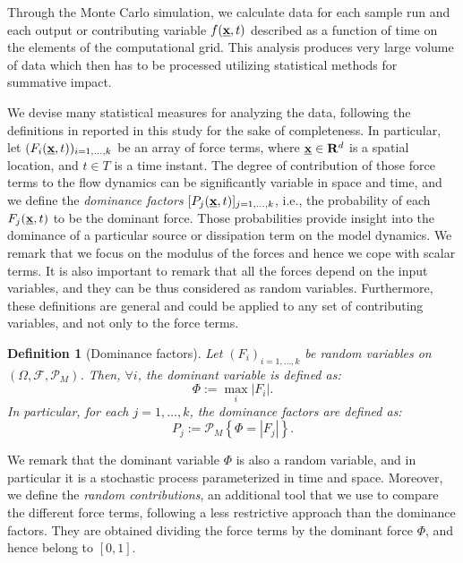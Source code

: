 \documentclass{article}
\newtheorem{definition}[theorem]{Definition}
\begin{document}
Through the Monte Carlo simulation, we calculate data for each sample run and each output or contributing variable $f(\underline{\textbf x},t)$ described as a function of time on the elements of the computational grid. This analysis produces very large volume of data which then has to be processed utilizing statistical methods for summative impact. %

We devise many statistical measures for analyzing the data, following the definitions in \cite{Patra2018b} reported in this study for the sake of completeness. In particular, let $(F_i(\underline{\textbf x},t))_{i=1,\dots, k}$ be an array of force terms, where $\underline{\textbf x}\in \mathbf R^d$ is a spatial location, and $t\in T$ is a time instant. The degree of contribution of those force terms to the flow dynamics can be significantly variable in space and time, and we define the \emph{dominance factors} $[P_j(\underline{\textbf x},t)]_{j=1,\dots, k}$, i.e., the probability of each $F_j(\underline{\textbf x},t)$ to be the dominant force. Those probabilities provide insight into the dominance of a particular source or dissipation term on the model dynamics. We remark that we focus on the modulus of the forces and hence we cope with scalar terms. It is also important to remark that all the forces depend on the input variables, and they can be thus considered as random variables. Furthermore, these definitions are general and could be applied to any set of contributing variables, and not only to the force terms.

\begin{definition}[Dominance factors]
Let $(F_i)_{i=1,\dots, k}$ be random variables on $(\Omega, \mathcal F,\mathcal P_M)$. Then, $\forall i$, the dominant variable is defined as:
$$\Phi:=\max_i |F_i|.$$
In particular, for each $j =1,\dots, k$, the dominance factors are defined as:
$$P_j:=\mathcal P_M\left\{\Phi=|F_j|\right\}.$$
\end{definition}

We remark that the dominant variable $\Phi$ is also a random variable, and in particular it is a stochastic process parameterized in time and space. Moreover, we define the \emph{random contributions}, an additional tool that we use to compare the different force terms, following a less restrictive approach than the dominance factors. They are obtained dividing the force terms by the dominant force $\Phi$, and hence belong to $[0,1]$.
\end{document}
